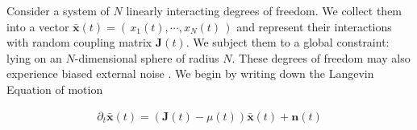 Consider a system of $N$ linearly interacting degrees of freedom. We collect them into a vector $\mathbf{\bar x}(t) = \left(\,x_1(t),\cdots, x_N(t)\,\right)$ and represent their interactions with random coupling matrix $\mathbf{J}(t)$. We subject them to a global constraint: lying on an $N$-dimensional sphere of radius $N$. These degrees of freedom may also experience biased external noise . We begin by writing down the Langevin Equation of motion

\begin{align}
\partial_t\mathbf{\bar x}(t) = (\mathbf{J}(t)-\mu(t))\mathbf{\bar x}(t)+\mathbf{n}(t)
\end{align}